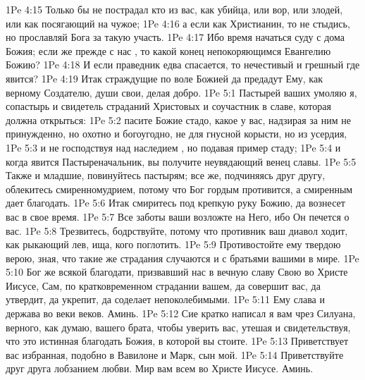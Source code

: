 \vs 1Pe 4:15 Только бы не пострадал кто из вас, как убийца, или вор, или злодей, или как посягающий на чужое;
\vs 1Pe 4:16 а если как Христианин, то не стыдись, но прославляй Бога за такую участь.
\vs 1Pe 4:17 Ибо время начаться суду с дома Божия; если же прежде с нас , то какой конец непокоряющимся Евангелию Божию?
\vs 1Pe 4:18 И если праведник едва спасается, то нечестивый и грешный где явится?
\vs 1Pe 4:19 Итак страждущие по воле Божией да предадут Ему, как верному Создателю, души свои, делая добро.
\vs 1Pe 5:1 Пастырей ваших умоляю я, сопастырь и свидетель страданий Христовых и соучастник в славе, которая должна открыться:
\vs 1Pe 5:2 пасите Божие стадо, какое у вас, надзирая за ним не принужденно, но охотно и богоугодно, не для гнусной корысти, но из усердия,
\vs 1Pe 5:3 и не господствуя над наследием , но подавая пример стаду;
\vs 1Pe 5:4 и когда явится Пастыреначальник, вы получите неувядающий венец славы.
\vs 1Pe 5:5 Также и младшие, повинуйтесь пастырям; все же, подчиняясь друг другу, облекитесь смиренномудрием, потому что Бог гордым противится, а смиренным дает благодать.
\rsbpar\vs 1Pe 5:6 Итак смиритесь под крепкую руку Божию, да вознесет вас в свое время.
\vs 1Pe 5:7 Все заботы ваши возложте на Него, ибо Он печется о вас.
\vs 1Pe 5:8 Трезвитесь, бодрствуйте, потому что противник ваш диавол ходит, как рыкающий лев, ища, кого поглотить.
\vs 1Pe 5:9 Противостойте ему твердою верою, зная, что такие же страдания случаются и с братьями вашими в мире.
\vs 1Pe 5:10 Бог же всякой благодати, призвавший нас в вечную славу Свою во Христе Иисусе, Сам, по кратковременном страдании вашем, да совершит вас, да утвердит, да укрепит, да соделает непоколебимыми.
\vs 1Pe 5:11 Ему слава и держава во веки веков. Аминь.
\rsbpar\vs 1Pe 5:12 Сие кратко написал я вам чрез Силуана, верного, как думаю, вашего брата, чтобы уверить вас, утешая и свидетельствуя, что это истинная благодать Божия, в которой вы стоите.
\rsbpar\vs 1Pe 5:13 Приветствует вас избранная, подобно  в Вавилоне и Марк, сын мой.
\vs 1Pe 5:14 Приветствуйте друг друга лобзанием любви. Мир вам всем во Христе Иисусе. Аминь.
